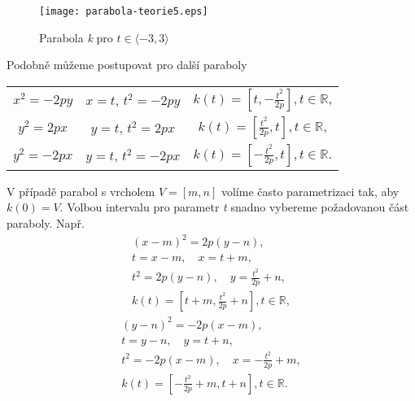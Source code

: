 		      \begin{figure}[H]
		      	\centering
		      	\texttt{[image: parabola-teorie5.eps]}
		      	\caption{Parabola \textit{k} pro $t \in \langle-3,3\rangle$}
		      \end{figure}
		      \clearpage
		      Podobně můžeme postupovat pro další paraboly \\
		      \begin{center}
		      	\begin{tabular}{ccc}
		      		$x^2=-2py$ & $x=t$, $t^2=-2py$ & $k(t)=\left[t, -\frac{t^2}{2p}\right], t \in \mathbb{R}$, \\ 
		      		$y^2=2px$  & $y=t$, $t^2=2px$  & $k(t)=\left[\frac{t^2}{2p}, t\right], t \in \mathbb{R}$,  \\ 
		      		$y^2=-2px$ & $y=t$, $t^2=-2px$ & $k(t)=\left[-\frac{t^2}{2p}, t\right], t \in \mathbb{R}$. 
		      	\end{tabular} 
		      \end{center}
		      V případě parabol s vrcholem $V=[m, n]$ volíme často parametrizaci tak, aby $k(0)=V$. Volbou intervalu pro parametr \textit{t} snadno vybereme požadovanou část paraboly.
		      Např. 
		      \begin{align*}
		      	(x-m)^2 = 2p(y-n),                                            \\
		      	t       = x-m,\quad x = t+m,                                  \\
		      	t^2     = 2p(y-n), \quad y = \frac{t^2}{2p}+n,                \\
		      	k(t)    = \left[t+m, \frac{t^2}{2p}+n\right], t\in\mathbb{R}, 
		      \end{align*}
		      \begin{align*}
		      	(y-n)^2 = -2p(x-m),                                            \\
		      	t       = y-n,\quad y = t+n,                                   \\
		      	t^2     = -2p(x-m),\quad  x = -\frac{t^2}{2p}+m,               \\
		      	k(t)    = \left[-\frac{t^2}{2p}+m, t+n\right], t\in\mathbb{R}. 
		      \end{align*}
		      \clearpage
